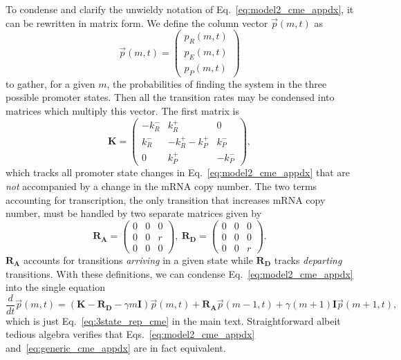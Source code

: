 To condense and clarify the unwieldy notation of Eq.~\ref{eq:model2_cme_appdx},
it can be rewritten in matrix form. We define the column vector $\vec{p}(m,t)$
as
\begin{equation}
\vec{p}(m,t)
= \begin{pmatrix} p_R(m,t) \\ p_E(m,t) \\ p_P(m,t) \end{pmatrix}
\end{equation}
to gather, for a given $m$, the probabilities of finding the system in the three
possible promoter states. Then all the transition rates may be condensed into
matrices which multiply this vector. The first matrix is
\begin{equation}
\mathbf{K} = \begin{pmatrix} -k_R^- & k_R^+ & 0 \\
                        k_R^- & -k_R^+ -k_P^+ & k_P^- \\
                        0 & k_P^+ & -k_P^- 
                \end{pmatrix},
\end{equation}
which tracks all promoter state changes in Eq.~\ref{eq:model2_cme_appdx} that
are \textit{not} accompanied by a change in the mRNA copy number. The two terms
accounting for transcription, the only transition that increases mRNA copy
number, must be handled by two separate matrices given by
\begin{equation}
\mathbf{R_A} = \begin{pmatrix}
                0 & 0 & 0 \\ 
                0 & 0 & r \\ 
                0 & 0 & 0
                \end{pmatrix},\
\mathbf{R_D} = \begin{pmatrix}
                0 & 0 & 0 \\ 
                0 & 0 & 0 \\ 
                0 & 0 & r
                \end{pmatrix}.
\end{equation}
$\mathbf{R_A}$ accounts for transitions \textit{arriving} in a given state while
$\mathbf{R_D}$ tracks \textit{departing} transitions. With these definitions, we
can condense Eq.~\ref{eq:model2_cme_appdx} into the single equation
\begin{equation}
\frac{d}{dt} \vec{p}(m,t) =
\left( \mathbf{K} - \mathbf{R_D} - \gamma m \mathbf{I} \right) \vec{p}(m,t)
                + \mathbf{R_A} \vec{p}(m-1,t) +
                \gamma (m+1) \mathbf{I} \vec{p}(m+1,t),
\label{eq:generic_cme_appdx}
\end{equation}
which is just Eq.~\ref{eq:3state_rep_cme} in the main text. Straightforward
albeit tedious algebra verifies that Eqs.~\ref{eq:model2_cme_appdx}
and~\ref{eq:generic_cme_appdx} are in fact equivalent.

